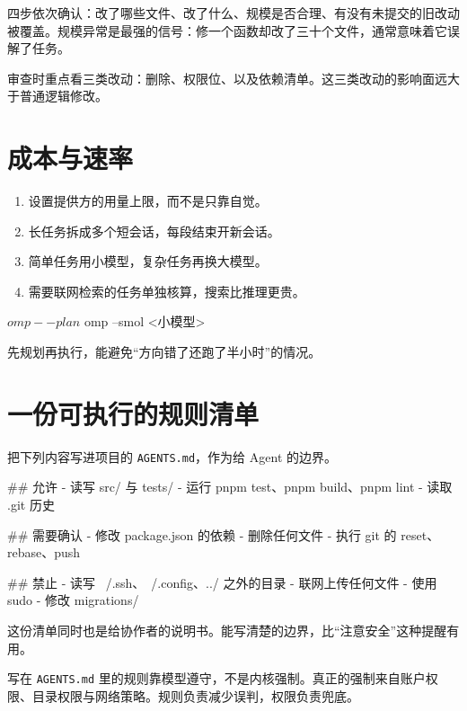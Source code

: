 四步依次确认：改了哪些文件、改了什么、规模是否合理、有没有未提交的旧改动被覆盖。规模异常是最强的信号：修一个函数却改了三十个文件，通常意味着它误解了任务。

审查时重点看三类改动：删除、权限位、以及依赖清单。这三类改动的影响面远大于普通逻辑修改。

\section{成本与速率}

\begin{enumerate}
  \item 设置提供方的用量上限，而不是只靠自觉。
  \item 长任务拆成多个短会话，每段结束开新会话。
  \item 简单任务用小模型，复杂任务再换大模型。
  \item 需要联网检索的任务单独核算，搜索比推理更贵。
\end{enumerate}

\begin{shellsession}
$ omp --plan
$ omp --smol <小模型>
\end{shellsession}

先规划再执行，能避免“方向错了还跑了半小时”的情况。

\section{一份可执行的规则清单}

把下列内容写进项目的 \texttt{AGENTS.md}，作为给 Agent 的边界。

\begin{textcode}
## 允许
- 读写 src/ 与 tests/
- 运行 pnpm test、pnpm build、pnpm lint
- 读取 .git 历史

## 需要确认
- 修改 package.json 的依赖
- 删除任何文件
- 执行 git 的 reset、rebase、push

## 禁止
- 读写 ~/.ssh、~/.config、../ 之外的目录
- 联网上传任何文件
- 使用 sudo
- 修改 migrations/
\end{textcode}

这份清单同时也是给协作者的说明书。能写清楚的边界，比“注意安全”这种提醒有用。

\begin{notebox}[规则不等于强制]
写在 \texttt{AGENTS.md} 里的规则靠模型遵守，不是内核强制。真正的强制来自账户权限、目录权限与网络策略。规则负责减少误判，权限负责兜底。
\end{notebox}

